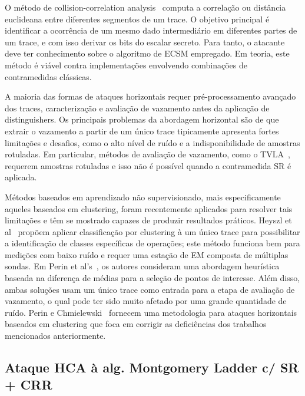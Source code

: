 O método de collision-correlation analysis~\cite{Bauer2013_CTRSA, Bauer2013, Clavier2012_Indocrypt, WittemanWoundenbergMenari2011, Walter2001_Ches} computa a correlação ou distância euclideana entre diferentes segmentos de um trace. O objetivo principal é identificar a ocorrência de um mesmo dado intermediário em diferentes partes de um trace, e com isso derivar os bits do escalar secreto. Para tanto, o atacante deve ter conhecimento sobre o algoritmo de ECSM empregado. Em teoria, este método é viável contra implementações envolvendo combinações de contramedidas clássicas.

A maioria das formas de ataques horizontais requer pré-processamento avançado dos traces, caracterização e avaliação de vazamento antes da aplicação de distinguishers. Os principais problemas da abordagem horizontal são de que extrair o vazamento a partir de um único trace tipicamente apresenta fortes limitações e desafios, como o alto nível de ruído e a indisponibilidade de amostras rotuladas. Em particular, métodos de avaliação de vazamento, como o TVLA~\cite{Goodwill2011}, requerem amostras rotuladas e isso não é possível quando a contramedida SR é aplicada.

Métodos baseados em aprendizado não supervisionado, mais especificamente aqueles baseados em clustering, foram recentemente aplicados para resolver tais limitações e têm se mostrado capazes de produzir resultados práticos. Heyszl et al~\cite{Heyszl2013} propõem aplicar classificação por clustering à um único trace para possibilitar a identificação de classes específicas de operações; este método funciona bem para medições com baixo ruído e requer uma estação de EM composta de múltiplas sondas. Em Perin et al's~\cite{Perin2014}, os autores consideram uma abordagem heurística baseada na diferença de médias para a seleção de pontos de interesse. Além disso, ambas soluções usam um único trace como entrada para a etapa de avaliação de vazamento, o qual pode ter sido muito afetado por uma grande quantidade de ruído. Perin e Chmielewski~\cite{PerinChmielewski2015} fornecem uma metodologia para ataques horizontais baseados em clustering que foca em corrigir as deficiências dos trabalhos mencionados anteriormente.

\subsection{Ataque HCA à alg. Montgomery Ladder c/ SR + CRR}

